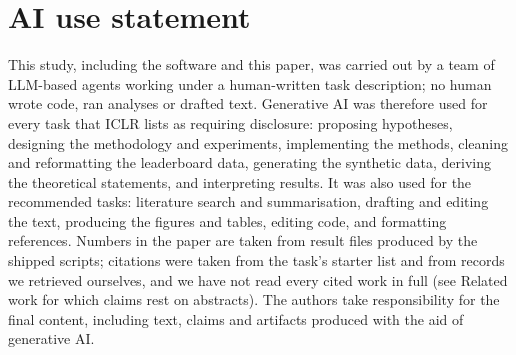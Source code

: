 \section*{AI use statement}
This study, including the software and this paper, was carried out by a team of LLM-based agents working under a human-written task description; no human wrote code, ran analyses or drafted text. Generative AI was therefore used for every task that ICLR lists as requiring disclosure: proposing hypotheses, designing the methodology and experiments, implementing the methods, cleaning and reformatting the leaderboard data, generating the synthetic data, deriving the theoretical statements, and interpreting results. It was also used for the recommended tasks: literature search and summarisation, drafting and editing the text, producing the figures and tables, editing code, and formatting references. Numbers in the paper are taken from result files produced by the shipped scripts; citations were taken from the task's starter list and from records we retrieved ourselves, and we have not read every cited work in full (see Related work for which claims rest on abstracts). The authors take responsibility for the final content, including text, claims and artifacts produced with the aid of generative AI.
